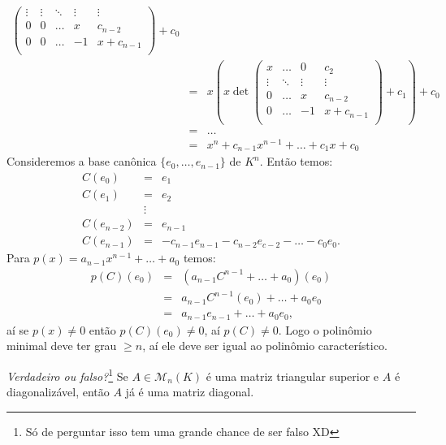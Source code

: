 \documentclass[11pt,a4paper]{article}
\begin{document}
{{\[\begin{array}{rcl}
\begin{pmatrix}
\vdots & \vdots & \ddots & \vdots & \vdots \\ 
0 & 0 & \ldots & x & c_{n-2} \\ 
0 & 0 & \ldots & -1 & x+c_{n-1} \\ 
\end{pmatrix}+c_0\\&=&
x\left(x\det\begin{pmatrix}
x & \ldots & 0 & c_2 \\ 
\vdots & \ddots & \vdots & \vdots \\ 
0 & \ldots & x & c_{n-2} \\ 
0 & \ldots & -1 & x+c_{n-1} \\ 
\end{pmatrix}+c_1\right)+c_0\\&=&
\dots\\&=&
x^n + c_{n-1}x^{n-1} + \ldots + c_1x + c_0
\end{array}
\]
\task[\pers{b}] Consideremos a base canônica $\{e_0,\dots,e_{n-1}\}$ de $K^n$. Então temos:
\[
\begin{array}{lcl}
C(e_0)&=&e_1\\
C(e_1)&=&e_2\\
&\vdots&\\
C(e_{n-2})&=&e_{n-1}\\
C(e_{n-1})&=&-c_{n-1}e_{n-1}-c_{n-2}e_{c-2}-\dots-c_0e_0.
\end{array}
\]
Para $p(x)=a_{n-1}x^{n-1}+\dots+a_0$ temos:
\[
\begin{array}{rcl}
p(C)(e_0)&=&(a_{n-1}C^{n-1}+\dots+a_0)(e_0)\\
&=&a_{n-1}C^{n-1}(e_0)+\dots+a_0e_0\\
&=&a_{n-1}e_{n-1}+\dots+a_0e_0,
\end{array}
\]
aí se $p(x)\neq 0$ então $p(C)(e_0)\neq 0$, aí $p(C)\neq 0$. Logo o polinômio minimal deve ter grau $\geq n$, aí ele deve ser igual ao polinômio característico.
}
}
   
 \textit{Verdadeiro ou falso?}\footnote{Só de perguntar isso tem uma grande chance de ser falso XD} Se $A \in \mathcal{M}_n(K)$ é uma matriz triangular superior e $A$ é diagonalizável, então $A$ já é uma matriz diagonal.

\end{document}
